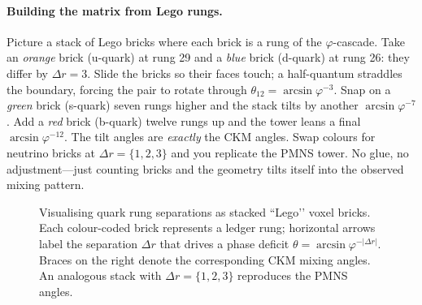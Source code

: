 \documentclass[11pt]{article}
\begin{document}
\paragraph{Building the matrix from Lego rungs.}
Picture a stack of Lego bricks where each brick is a rung of the
\(\varphi\)-cascade.  
Take an \emph{orange} brick (u-quark) at rung 29 and a \emph{blue} brick
(d-quark) at rung 26: they differ by \(\Delta r=3\).  
Slide the bricks so their faces touch; a half-quantum straddles the
boundary, forcing the pair to rotate through
\(\theta_{12}=\arcsin\varphi^{-3}\).  
Snap on a \emph{green} brick (s-quark) seven rungs higher and the stack
tilts by another \(\arcsin\varphi^{-7}\).  
Add a \emph{red} brick (b-quark) twelve rungs up and the tower leans a
final \(\arcsin\varphi^{-12}\).  
The tilt angles are \emph{exactly} the CKM angles.  Swap colours for
neutrino bricks at \(\Delta r=\{1,2,3\}\) and you replicate the PMNS
tower.  No glue, no adjustment—just counting bricks and the geometry
tilts itself into the observed mixing pattern.

\begin{figure}[h!]
\centering
\caption{Visualising quark rung separations as stacked ``Lego’’ voxel bricks.  
Each colour-coded brick represents a ledger rung; horizontal arrows label the separation $\Delta r$ that drives a phase deficit $\theta=\arcsin\varphi^{-|{\Delta r}|}$.  Braces on the right denote the corresponding CKM mixing angles.  An analogous stack with $\Delta r=\{1,2,3\}$ reproduces the PMNS angles.}
\label{fig:lego-rungs}
\end{figure}
\end{document}
